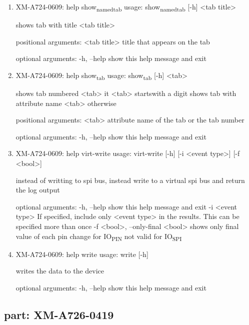 \documentclass[11pt]{article}
\begin{document}
\begin{enumerate}
\item XM-A724-0609: help show\textsubscript{named}\textsubscript{tab}
\label{sec:org8334bce}
usage: show\textsubscript{named}\textsubscript{tab} [-h] <tab title>

shows tab with title <tab title>

positional arguments:
  <tab title>  title that appears on the tab

optional arguments:
  -h, --help   show this help message and exit

\item XM-A724-0609: help show\textsubscript{tab}
\label{sec:org0f82151}
usage: show\textsubscript{tab} [-h] <tab>

shows tab numbered <tab> it <tab> startswith a digit shows tab with attribute
name <tab> otherwise

positional arguments:
  <tab>       attribute name of the tab or the tab number

optional arguments:
  -h, --help  show this help message and exit

\item XM-A724-0609: help virt-write
\label{sec:org20bad9c}
usage: virt-write [-h] [-i <event type>] [-f <bool>]

instead of writting to spi bus, instead write to a virtual spi bus and return
the log output

optional arguments:
  -h, --help            show this help message and exit
  -i <event type>       If specified, include only <event type> in the
                        results. This can be specified more than once
  -f <bool>, --only-final <bool>
                        shows only final value of each pin change for IO\textsubscript{PIN}
                        not valid for IO\textsubscript{SPI}

\item XM-A724-0609: help write
\label{sec:org063f22c}
usage: write [-h]

writes the data to the device

optional arguments:
  -h, --help  show this help message and exit
\end{enumerate}

\subsection{part: XM-A726-0419}
\label{sec:org85d7820}
\end{document}
